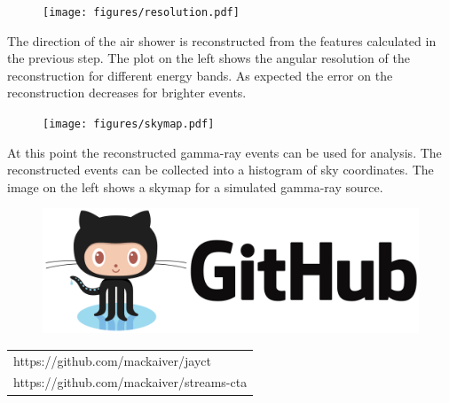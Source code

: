 \begin{multicols}{2}
\begin{center}
        \begin{streamblock}[equal height group=C, width=0.8\linewidth]{-5mm}{-5mm}{}%
          \begin{multicols}{2}
            \begin{figure}
              \texttt{[image: figures/resolution.pdf]}
            \end{figure}
            \columnbreak
            The direction of the air shower is reconstructed from the features calculated in the previous step.
            The plot on the left shows the angular resolution of the reconstruction for different energy bands.
            As expected the error on the reconstruction decreases for brighter events.
          \end{multicols}
        \end{streamblock}%

        \begin{streamblock}[equal height group=C, width=0.8\linewidth]{-5mm}{0}{}%
          \begin{multicols}{2}
            \begin{figure}
              \texttt{[image: figures/skymap.pdf]}
            \end{figure}
            \columnbreak
            At this point the reconstructed gamma-ray events can be used for analysis.
            The reconstructed events can be collected into a histogram of sky coordinates.
            The image on the left shows a skymap for a simulated gamma-ray source.
          \end{multicols}
        \end{streamblock}%
        \vspace{2cm}
        \begin{multicols}{2}
            \begin{figure}
              \includegraphics[width=\linewidth]{logos/github.png}
            \end{figure}
            \columnbreak
                \vspace*{2cm}
                \begin{tabular}{l}
                https://github.com/mackaiver/jayct \\
                https://github.com/mackaiver/streams-cta
                \end{tabular}




          \end{multicols}


      \end{center}

\end{multicols}


